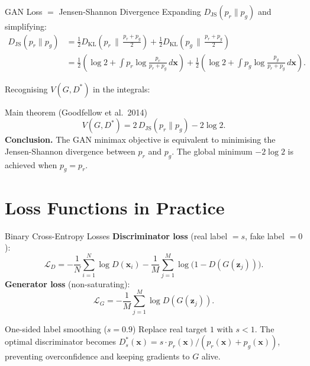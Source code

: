 \documentclass[aspectratio=169,11pt]{beamer}
\newcommand{\DKL}{D_{\mathrm{KL}}}
\newcommand{\bx}{\bm{x}}
\newcommand{\bz}{\bm{z}}
\newcommand{\pr}{p_{r}}           %
\newcommand{\pg}{p_{g}}           %
\newcommand{\JS}{D_{\mathrm{JS}}} %
\newcommand{\KL}{D_{\mathrm{KL}}} %
\begin{document}
\begin{frame}{GAN Loss $=$ Jensen-Shannon Divergence}
  Expanding $\JS(\pr\|\pg)$ and simplifying:
  \begin{align*}
    \JS(\pr\|\pg)
    &= \frac{1}{2}\KL\!\left(\pr\,\Big\|\,\frac{\pr+\pg}{2}\right)
     + \frac{1}{2}\KL\!\left(\pg\,\Big\|\,\frac{\pr+\pg}{2}\right)\\
    &= \frac{1}{2}\!\left(\log 2
       + \int\pr\log\frac{\pr}{\pr+\pg}\,d\bx\right)
     + \frac{1}{2}\!\left(\log 2
       + \int\pg\log\frac{\pg}{\pr+\pg}\,d\bx\right).
  \end{align*}

  Recognising $V(G,D^*)$ in the integrals:

  \begin{block}{Main theorem (Goodfellow et al.\ 2014)}
    \[
      \boxed{V(G,D^*) = 2\,\JS(\pr\|\pg) - 2\log 2.}
    \]
    \textbf{Conclusion.} The GAN minimax objective is equivalent to minimising the
    Jensen-Shannon divergence between $\pr$ and $\pg$.
    The global minimum $-2\log 2$ is achieved when $\pg=\pr$.
  \end{block}
\end{frame}

\section{Loss Functions in Practice}

\begin{frame}{Binary Cross-Entropy Losses}
\small
  \textbf{Discriminator loss} (real label $=s$, fake label $=0$):
  \[
    \mathcal{L}_D
    = -\frac{1}{N}\sum_{i=1}^N \log D(\bx_i)
      -\frac{1}{M}\sum_{j=1}^M \log\bigl(1-D(G(\bz_j))\bigr).
  \]
  \textbf{Generator loss} (non-saturating):
  \[
    \mathcal{L}_G
    = -\frac{1}{M}\sum_{j=1}^M \log D(G(\bz_j)).
  \]
  \begin{block}{One-sided label smoothing ($s=0.9$)}
    Replace real target $1$ with $s<1$. The optimal discriminator becomes
    $D^*_s(\bx) = s\cdot\pr(\bx)/(\pr(\bx)+\pg(\bx))$,
    preventing overconfidence and keeping gradients to $G$ alive.
  \end{block}
\end{frame}
\end{document}
